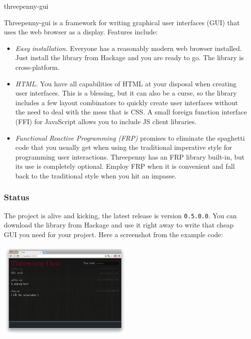 \begin{hcarentry}[updated]{threepenny-gui}
\label{threepenny-gui}
\makeheader

Threepenny-gui is a framework for writing graphical user interfaces (GUI) that uses the web browser as a display. Features include:

\begin{itemize}
\item \emph{Easy installation.} Everyone has a reasonably modern web browser installed. Just install the library from Hackage and you are ready to go. The library is cross-platform.
\item \emph{HTML.} You have all capabilities of HTML at your disposal when creating user interfaces. This is a blessing, but it can also be a curse, so the library includes a few layout combinators to quickly create user interfaces without the need to deal with the mess that is CSS. A small foreign function interface (FFI) for JavaScript allows you to include JS client libraries.
\item \emph{Functional Reactive Programming (FRP)} promises to eliminate the spaghetti code that you usually get when using the traditional imperative style for programming user interactions. Threepenny has an FRP library built-in, but its use is completely optional. Employ FRP when it is convenient and fall back to the traditional style when you hit an impasse.
\end{itemize}

\subsubsection*{Status}

The project is alive and kicking, the latest release is version \verb`0.5.0.0`. You can download the library from Hackage and use it right away to write that cheap GUI you need for your project. Here a screenshot from the example code:

\begin{center}
\includegraphics[width=0.5\textwidth]{html/chat.jpg}
\end{center}


\end{hcarentry}
